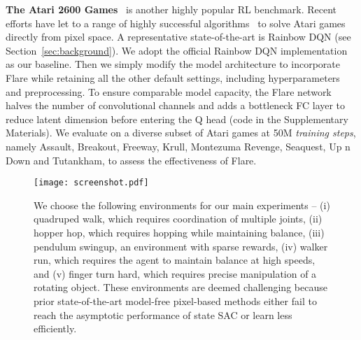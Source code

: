 \documentclass{article} \usepackage{iclr2021_conference,times}
\begin{document}
    \textbf{The Atari 2600 Games}~\citep{bellemare2013arcade} is another highly popular RL benchmark. Recent efforts have let to a range of highly successful algorithms~\citep{espeholt2018impala, hessel2017rainbow, kapturowski2018recurrent, hafner2019dream, agent57} to solve Atari games directly from pixel space. A representative state-of-the-art is Rainbow DQN (see Section~\ref{sec:background}). We adopt the official Rainbow DQN implementation~\citep{dqnzoo2020github} as our baseline. Then we simply modify the model architecture to incorporate Flare while retaining all the other default settings, including hyperparameters and preprocessing. To ensure comparable model capacity, the Flare network halves the number of convolutional channels and adds a bottleneck FC layer to reduce latent dimension before entering the Q head (code in the Supplementary Materials). We evaluate on a diverse subset of Atari games at 50M \emph{training steps}, namely Assault, Breakout, Freeway, Krull, Montezuma Revenge, Seaquest, Up n Down and Tutankham, to assess the effectiveness of Flare.

\begin{figure}[t]
\begin{center}
\texttt{[image: screenshot.pdf]}
\end{center}
\small
\caption{We choose the following environments for our main experiments -- (i) quadruped walk, which requires coordination of multiple joints, (ii) hopper hop, which requires hopping while maintaining balance, (iii) pendulum swingup, an environment with sparse rewards, (iv) walker run, which requires the agent to maintain balance at high speeds, and (v) finger turn hard, which requires precise manipulation of a rotating object. These environments are deemed challenging because prior state-of-the-art model-free pixel-based methods \citep{laskin_srinivas2020curl,kostrikov2020image,laskin_lee2020rad} either fail to reach the asymptotic performance of state SAC or learn less efficiently.  }
\label{fig:envs}
\vspace{-3mm}
\end{figure}

\iffalse
\end{document}
